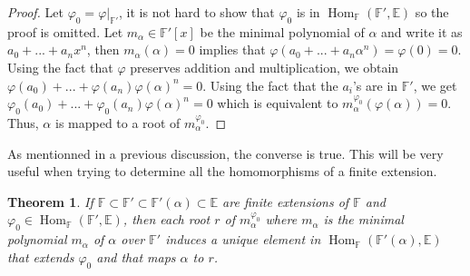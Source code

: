 \documentclass{article}
\theoremstyle{plain}
\newtheorem{theorem}{Theorem}[subsection]
\theoremstyle{definition}
\newcommand{\F}{\mathbb{F}}
\newcommand{\E}{\mathbb{E}}
\DeclareMathOperator{\Hom}{Hom}
\begin{document}
\begin{proof}
    Let $\varphi_0 = \varphi|_{\F'}$, it is not hard to show that $\varphi_0$ is in $\Hom_{\F}(\F', \E)$ so the proof is omitted. Let $m_{\alpha} \in \F'[x]$ be the minimal polynomial of $\alpha$ and write it as $a_0 + ... + a_nx^n$, then $m_{\alpha}(\alpha) = 0$ implies that $\varphi(a_0 + ... + a_n\alpha^n) = \varphi(0) = 0$. Using the fact that $\varphi$ preserves addition and multiplication, we obtain $\varphi(a_0) + ... + \varphi(a_n)\varphi(\alpha)^n = 0$. Using the fact that the $a_i$'s are in $\F'$, we get $\varphi_0(a_0) + ... + \varphi_0(a_n)\varphi(\alpha)^n = 0$ which is equivalent to $m_{\alpha}^{\varphi_0}(\varphi(\alpha)) = 0$. Thus, $\alpha$ is mapped to a root of $m_{\alpha}^{\varphi_0}$.
\end{proof}

As mentionned in a previous discussion, the converse is true. This will be very useful when trying to determine all the homomorphisms of a finite extension.

\begin{theorem}
\label{roots induce automorphisms}
    If $\F \subset \F' \subset \F'(\alpha) \subset \E$ are finite extensions of $\F$ and $\varphi_0 \in \Hom_{\F}(\F', \E)$, then each root $r$ of $m_{\alpha}^{\varphi_0}$ where $m_{\alpha}$ is the minimal polynomial $m_{\alpha}$ of $\alpha$ over $\F'$ induces a unique element in $\Hom_{\F}(\F'(\alpha), \E)$ that extends $\varphi_0$ and that maps $\alpha$ to $r$.
\end{theorem}
\end{document}
